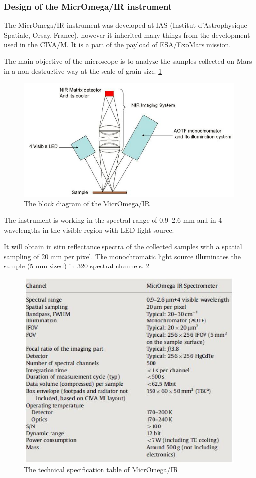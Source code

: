 \subsubsection{Design of the MicrOmega/IR instrument} 

The MicrOmega/IR instrument was developed at IAS (Institut d'Astrophysique Spatiale, Orsay, France), however it inherited many things from the development used in the CIVA/M. It is a part of the payload of ESA/ExoMars mission. 

The main objective of the microscope is to analyze the samples collected on Mars in a non-destructive way at the scale of grain size.
\ref{fig:Block_diagram}

\begin{figure}[htb]
  \centering
  \includegraphics[scale=0.8]{figures/BFfig/Block_diagram}
  \caption{The block diagram of the MicrOmega/IR}
  \label{fig:Block_diagram}
\end{figure}

The instrument is working in the spectral range of 0.9–2.6 mm and in 4 wavelengths in the visible region with LED light source.
\cite{Leroi20091068}

It will obtain in situ reflectance spectra of the collected samples with a spatial sampling of 20 mm per pixel. The monochromatic light source illuminates the sample (5 mm sized) in 320 spectral channels.
\ref{fig:Specs_for_MicrOmega}

\begin{figure}[htb]
  \centering
  \includegraphics[width=.48\textwidth]{figures/BFfig/Specs_for_MicrOmega}
  \caption{The technical specification table of MicrOmega/IR}
  \label{fig:Specs_for_MicrOmega}
\end{figure}

